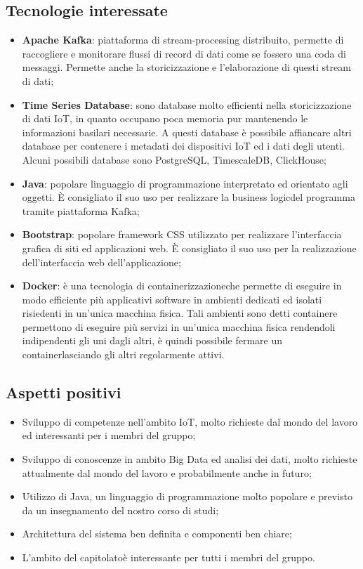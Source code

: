 \subsection{Tecnologie interessate}
\begin{itemize}
	\item \textbf{Apache Kafka}: piattaforma di stream-processing distribuito, permette di raccogliere e monitorare flussi di record di dati come se fossero una coda di messaggi. Permette anche la storicizzazione e l'elaborazione di questi stream di dati;
	\item \textbf{Time Series Database}: sono database molto efficienti nella storicizzazione di dati IoT, in quanto occupano poca memoria pur mantenendo le informazioni basilari necessarie. A questi database è possibile affiancare altri database per contenere i metadati dei dispositivi IoT ed i dati degli utenti. Alcuni possibili database sono PostgreSQL, TimescaleDB, ClickHouse;
	\item \textbf{Java}: popolare linguaggio di programmazione interpretato ed orientato agli oggetti. È consigliato il suo uso per realizzare la business logic\glosp del programma tramite piattaforma Kafka;
	\item \textbf{Bootstrap}: popolare framework CSS utilizzato per realizzare l'interfaccia grafica di siti ed applicazioni web. È consigliato il suo uso per la realizzazione dell'interfaccia web dell'applicazione;
	\item \textbf{Docker}: è una tecnologia di containerizzazione\glosp che permette di eseguire in modo efficiente più applicativi software in ambienti dedicati ed isolati risiedenti in un'unica macchina fisica. Tali ambienti sono detti container\glosp e permettono di eseguire più servizi in un'unica macchina fisica rendendoli indipendenti gli uni dagli altri, è quindi possibile fermare un container\glosp lasciando gli altri regolarmente attivi.
\end{itemize} 
\subsection{Aspetti positivi}
\begin{itemize} 
	\item Sviluppo di competenze nell'ambito IoT, molto richieste dal mondo del lavoro ed interessanti per i membri del gruppo;
	\item Sviluppo di conoscenze in ambito Big Data ed analisi dei dati, molto richieste attualmente dal mondo del lavoro e probabilmente anche in futuro;
	\item Utilizzo di Java, un linguaggio di programmazione molto popolare e previsto da un insegnamento del nostro corso di studi;
	\item Architettura del sistema ben definita e componenti ben chiare;
	\item L'ambito del capitolato\glosp è interessante per tutti i membri del gruppo.
\end{itemize}
